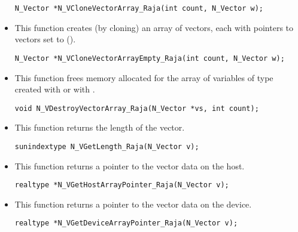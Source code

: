 \begin{itemize}
\begin{verbatim}
N_Vector *N_VCloneVectorArray_Raja(int count, N_Vector w);
\end{verbatim}


\item {}
 
  This function creates (by cloning) an array of  {\nvecraja} vectors,
  each with pointers to {\raja} vectors set to ().
 
\begin{verbatim}
N_Vector *N_VCloneVectorArrayEmpty_Raja(int count, N_Vector w);
\end{verbatim}


\item {}
 
 This function frees memory allocated for the array of  variables of
 type  created with  or with
 .
 

 \verb|void N_VDestroyVectorArray_Raja(N_Vector *vs, int count);|


\item {}
 
 This function returns the length of the vector.

 \verb|sunindextype N_VGetLength_Raja(N_Vector v);|


\item {}
 
 This function returns a pointer to the vector data on the host.

 \verb|realtype *N_VGetHostArrayPointer_Raja(N_Vector v);|



\item {}
 
 This function returns a pointer to the vector data on the device.

 \verb|realtype *N_VGetDeviceArrayPointer_Raja(N_Vector v);|




\end{itemize}

